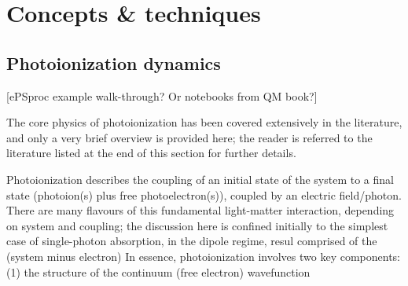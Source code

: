 \section{Concepts \& techniques}

\subsection{Photoionization dynamics} 
[ePSproc example walk-through? Or notebooks from QM book?]

The core physics of photoionization has been covered extensively in the literature, and only a very brief overview is provided here; the reader is referred to the literature listed at the end of this section for further details.

Photoionization describes the coupling of an initial state of the system to a final state (photoion(s) plus free photoelectron(s)), coupled by an electric field/photon. There are many flavours of this fundamental light-matter interaction, depending on system and coupling; the discussion here is confined initially to the simplest case of single-photon absorption, in the dipole regime, resul
comprised of the (system minus electron)  In essence, photoionization involves two key components: (1) the structure of the continuum (free electron) wavefunction 